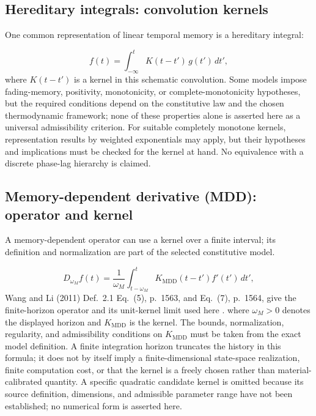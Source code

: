 \subsection{Hereditary integrals: convolution kernels}
\label{sec:6.3}

One common representation of linear temporal memory is a hereditary integral:

\begin{equation}
f(t) = \int_{-\infty}^{t} K(t-t')\,g(t')\,dt',
\label{eq:6.6}
\end{equation}
where $K(t-t')$ is a kernel in this schematic convolution. Some models impose fading-memory, positivity, monotonicity, or complete-monotonicity hypotheses, but the required conditions depend on the constitutive law and the chosen thermodynamic framework; none of these properties alone is asserted here as a universal admissibility criterion. For suitable completely monotone kernels, representation results by weighted exponentials may apply, but their hypotheses and implications must be checked for the kernel at hand. No equivalence with a discrete phase-lag hierarchy is claimed.

\subsection{Memory-dependent derivative (MDD): operator and kernel}
\label{sec:6.4}

A memory-dependent operator can use a kernel over a finite interval; its definition and normalization are part of the selected constitutive model.

\begin{equation}
D_{\omega_M} f(t) = \frac{1}{\omega_M}\int_{t-\omega_M}^{t} K_{\mathrm{MDD}}(t-t') f'(t')\,dt',
\label{eq:6.7}
\end{equation}
Wang and Li (2011) Def.~2.1 Eq.~(5), p.~1563, and Eq.~(7), p.~1564, give the finite-horizon operator and its unit-kernel limit used here \cite{Wang2011}.
where $\omega_M>0$ denotes the displayed horizon and $K_{\mathrm{MDD}}$ is the kernel. The bounds, normalization, regularity, and admissibility conditions on $K_{\mathrm{MDD}}$ must be taken from the exact model definition. A finite integration horizon truncates the history in this formula; it does not by itself imply a finite-dimensional state-space realization, finite computation cost, or that the kernel is a freely chosen rather than material-calibrated quantity. A specific quadratic candidate kernel is omitted because its source definition, dimensions, and admissible parameter range have not been established; no numerical form is asserted here.


